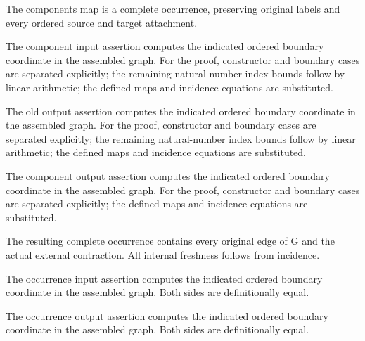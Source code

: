 The components map is a complete occurrence, preserving original labels and every ordered source and target attachment.
\par{}

The component input assertion computes the indicated ordered boundary coordinate in the assembled graph.
For the proof, constructor and boundary cases are separated explicitly; the remaining natural-number index bounds follow by linear arithmetic; the defined maps and incidence equations are substituted.
\par{}

The old output assertion computes the indicated ordered boundary coordinate in the assembled graph.
For the proof, constructor and boundary cases are separated explicitly; the remaining natural-number index bounds follow by linear arithmetic; the defined maps and incidence equations are substituted.
\par{}

The component output assertion computes the indicated ordered boundary coordinate in the assembled graph.
For the proof, constructor and boundary cases are separated explicitly; the defined maps and incidence equations are substituted.
\par{}

The resulting complete occurrence contains every original edge of G and the actual external contraction. All internal freshness follows from incidence.
\par{}

The occurrence input assertion computes the indicated ordered boundary coordinate in the assembled graph.
Both sides are definitionally equal.
\par{}

The occurrence output assertion computes the indicated ordered boundary coordinate in the assembled graph.
Both sides are definitionally equal.
\par{}


